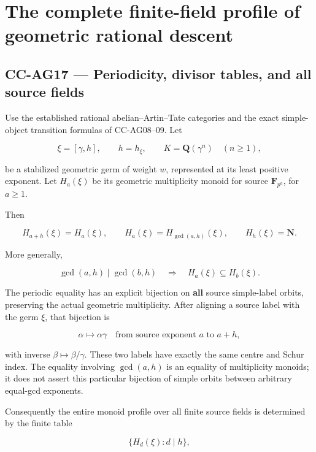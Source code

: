 \section{The complete finite-field profile of geometric rational
descent}\label{the-complete-finite-field-profile-of-geometric-rational-descent}

\subsection{CC-AG17 --- Periodicity, divisor tables, and all source
fields}\label{cc-ag17-periodicity-divisor-tables-and-all-source-fields}

Use the established rational abelian--Artin--Tate categories and the
exact simple-object transition formulas of CC-AG08--09. Let

\[
 \xi=[\gamma,h],\qquad
 h=h_\xi,\qquad K=\mathbf Q(\gamma^n)\quad(n\ge1),
 \tag{CC-AG.171}
\]

be a stabilized geometric germ of weight \(w\), represented at its least
positive exponent. Let \(H_a(\xi)\) be its geometric multiplicity monoid
for source \(\mathbf F_{p^a}\), for \(a\ge1\).

Then

\[
 H_{a+h}(\xi)=H_a(\xi),\qquad
 H_a(\xi)=H_{\gcd(a,h)}(\xi),\qquad H_h(\xi)=\mathbf N.
 \tag{CC-AG.172}
\]

More generally,

\[
 \gcd(a,h)\mid\gcd(b,h)
          \quad\Longrightarrow\quad H_a(\xi)\subseteq H_b(\xi).
 \tag{CC-AG.173}
\]

The periodic equality has an explicit bijection on \textbf{all} source
simple-label orbits, preserving the actual geometric multiplicity. After
aligning a source label with the germ \(\xi\), that bijection is

\[
                 \alpha\longmapsto\alpha\gamma
       \quad\text{from source exponent }a\text{ to }a+h,
 \tag{CC-AG.174}
\]

with inverse \(\beta\mapsto\beta/\gamma\). These two labels have exactly
the same centre and Schur index. The equality involving \(\gcd(a,h)\) is
an equality of multiplicity monoids; it does not assert this particular
bijection of simple orbits between arbitrary equal-gcd exponents.

Consequently the entire monoid profile over all finite source fields is
determined by the finite table

\[
                         \{H_d(\xi):d\mid h\},
 \tag{CC-AG.175}
\]

